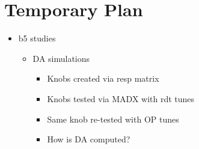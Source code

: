 \chapter*{Temporary Plan}

\begin{itemize}
    \tightlist
    \item b5 studies
    \begin{itemize}
        \item DA simulations
        \begin{itemize}
            \item Knobs created via resp matrix
            \item Knobs tested via MADX with rdt tunes
            \item Same knob re-tested with OP tunes
            \item How is DA computed?
        \end{itemize}
    \end{itemize}
\end{itemize}